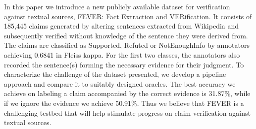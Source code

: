 In this paper we introduce a new publicly available dataset for verification against textual sources, FEVER: Fact Extraction and VERification. It consists of 185,445 claims generated by altering sentences extracted from Wikipedia and subsequently verified without knowledge of the sentence they were derived from. The claims are classified as Supported, Refuted or NotEnoughInfo by annotators achieving 0.6841 in Fleiss kappa.  For the first two classes, the annotators also recorded the sentence(s) forming the necessary evidence for their judgment. To characterize the challenge of the dataset presented, we develop a pipeline approach and compare it to suitably designed oracles. The best accuracy we achieve on labeling a claim accompanied by the correct evidence is 31.87\%, while if we ignore the evidence we achieve 50.91\%. Thus we believe that FEVER is a challenging testbed that will help stimulate progress on claim verification against textual sources.
